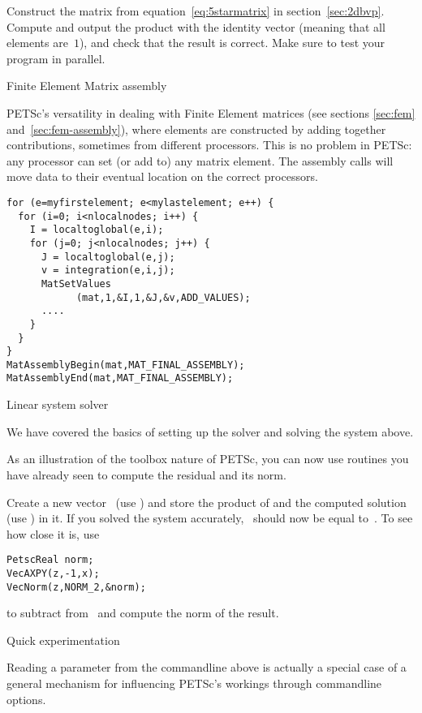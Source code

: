 \begin{exercise}
  Construct the matrix from equation~\eqref{eq:5starmatrix} in
  section~\ref{sec:2dbvp}. Compute and output the product with the
  identity vector (meaning that all elements are~$1$), and check that
  the result is correct. Make sure to test your program in parallel.
\end{exercise}

 {Finite Element Matrix assembly}

PETSc's versatility in dealing with Finite Element matrices (see
sections \ref{sec:fem} and~\ref{sec:fem-assembly}), where elements are
constructed by adding together contributions, sometimes from different
processors. This is no problem in PETSc: any processor can set (or
add to) any matrix element. The assembly calls will move data to their
eventual location on the correct processors.

\begin{verbatim}
for (e=myfirstelement; e<mylastelement; e++) {
  for (i=0; i<nlocalnodes; i++) {
    I = localtoglobal(e,i);
    for (j=0; j<nlocalnodes; j++) {
      J = localtoglobal(e,j);
      v = integration(e,i,j);
      MatSetValues
            (mat,1,&I,1,&J,&v,ADD_VALUES);
      ....
    }
  }
}
MatAssemblyBegin(mat,MAT_FINAL_ASSEMBLY);
MatAssemblyEnd(mat,MAT_FINAL_ASSEMBLY);
\end{verbatim}

 {Linear system solver}

We have covered the basics of setting up the solver and solving the
system above.

As an illustration of the toolbox nature of PETSc, you can now use
routines you have already seen to compute the residual and its norm.

\begin{exercise}
  Create a new vector~ (use ) and store the
  product of  and the computed solution~ (use )
  in it. If you solved the system accurately, ~should now be
  equal to~. To see how close it is, use
\begin{verbatim}
PetscReal norm;
VecAXPY(z,-1,x);
VecNorm(z,NORM_2,&norm);
\end{verbatim}
  to subtract  from~ and compute the norm of the result.
\end{exercise}

 {Quick experimentation}

Reading a parameter from the
commandline above is actually a special case of a general mechanism
for influencing PETSc's workings through commandline options.

